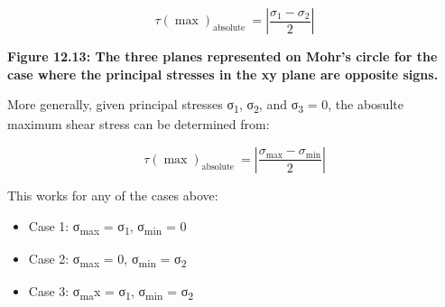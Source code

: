 \documentclass[
  letterpaper,
  DIV=11,
  numbers=noendperiod]{scrreprt}
\begin{document}
\[
\tau(\max )_{\text {absolute }}=\left|\frac{\sigma_1-\sigma_2}{2}\right|
\]

\textbf{Figure 12.13: The three planes represented on Mohr's circle for
the case where the principal stresses in the xy plane are opposite
signs.}

More generally, given principal stresses σ\textsubscript{1},
σ\textsubscript{2}, and σ\textsubscript{3} = 0, the abosulte maximum
shear stress can be determined from:

\[
\tau(\max )_{\text {absolute }}=\left|\frac{\sigma_{\max }-\sigma_{\min }}{2}\right|
\]

This works for any of the cases above:

\begin{itemize}
\item
  Case 1: σ\textsubscript{max} = σ\textsubscript{1},
  σ\textsubscript{min} = 0
\item
  Case 2: σ\textsubscript{max} = 0, σ\textsubscript{min} =
  σ\textsubscript{2}
\item
  Case 3: σ\textsubscript{ma}x = σ\textsubscript{1},
  σ\textsubscript{min} = σ\textsubscript{2}
\end{itemize}
\end{document}

